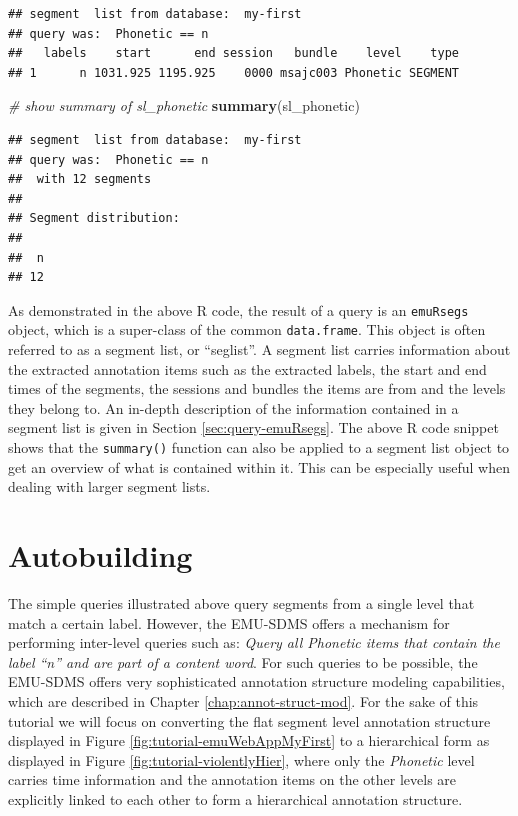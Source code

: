 \documentclass[]{book}
\newenvironment{Shaded}{\begin{snugshade}}{\end{snugshade}}
\newcommand{\CommentTok}[1]{\textcolor[rgb]{0.56,0.35,0.01}{\textit{#1}}}
\newcommand{\KeywordTok}[1]{\textcolor[rgb]{0.13,0.29,0.53}{\textbf{#1}}}
\newcommand{\NormalTok}[1]{#1}
\begin{document}
\begin{verbatim}
## segment  list from database:  my-first 
## query was:  Phonetic == n 
##   labels    start      end session   bundle    level    type
## 1      n 1031.925 1195.925    0000 msajc003 Phonetic SEGMENT
\end{verbatim}

\begin{Shaded}
\begin{Highlighting}[]
\CommentTok{# show summary of sl_phonetic}
\KeywordTok{summary}\NormalTok{(sl_phonetic)}
\end{Highlighting}
\end{Shaded}

\begin{verbatim}
## segment  list from database:  my-first 
## query was:  Phonetic == n 
##  with 12 segments
## 
## Segment distribution:
## 
##  n 
## 12
\end{verbatim}

As demonstrated in the above R code, the result of a query is an \texttt{emuRsegs} object, which is a super-class of the common \texttt{data.frame}. This object is often referred to as a segment list, or ``seglist''. A segment list carries information about the extracted annotation items such as the extracted labels, the start and end times of the segments, the sessions and bundles the items are from and the levels they belong to. An in-depth description of the information contained in a segment list is given in Section \ref{sec:query-emuRsegs}. The above R code snippet shows that the \texttt{summary()} function can also be applied to a segment list object to get an overview of what is contained within it. This can be especially useful when dealing with larger segment lists.

\hypertarget{autobuilding}{%
\section{Autobuilding}\label{autobuilding}}

The simple queries illustrated above query segments from a single level that match a certain label. However, the EMU-SDMS offers a mechanism for performing inter-level queries such as: \emph{Query all Phonetic items that contain the label ``n'' and are part of a content word}. For such queries to be possible, the EMU-SDMS offers very sophisticated annotation structure modeling capabilities, which are described in Chapter \ref{chap:annot-struct-mod}. For the sake of this tutorial we will focus on converting the flat segment level annotation structure displayed in Figure \ref{fig:tutorial-emuWebAppMyFirst} to a hierarchical form as displayed in Figure \ref{fig:tutorial-violentlyHier}, where only the \emph{Phonetic} level carries time information and the annotation items on the other levels are explicitly linked to each other to form a hierarchical annotation structure.
\end{document}
